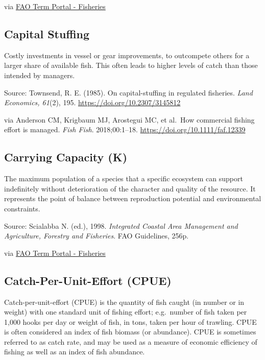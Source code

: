\documentclass[
  11pt,
]{book}
\begin{document}
via \href{http://www.fao.org/fishery/glossary/en}{FAO Term Portal - Fisheries}

\hypertarget{capital-stuffing}{%
\subsection{Capital Stuffing}\label{capital-stuffing}}

Costly investments in vessel or gear improvements, to outcompete others for a larger share of available fish. This often leads to higher levels of catch than those intended by managers.

Source: Townsend, R. E. (1985). On capital-stuffing in regulated fisheries. \emph{Land
Economics, 61}(2), 195. \url{https://doi.org/10.2307/3145812}

via Anderson CM, Krigbaum MJ,
Arostegui MC, et al.~How commercial fishing effort is managed. \emph{Fish Fish}. 2018;00:1--18. \url{https://doi.org/10.1111/faf.12339}

\hypertarget{carrying-capacity-k}{%
\subsection{Carrying Capacity (K)}\label{carrying-capacity-k}}

The maximum population of a species that a specific ecosystem can support indefinitely without deterioration of the character and quality of the resource. It represents the point of balance between reproduction potential and environmental constraints.

Source: Scialabba N. (ed.), 1998. \emph{Integrated Coastal Area Management and Agriculture, Forestry and Fisheries}. FAO Guidelines, 256p.

via \href{http://www.fao.org/fishery/glossary/en}{FAO Term Portal - Fisheries}

\hypertarget{catch-per-unit-effort-cpue}{%
\subsection{Catch-Per-Unit-Effort (CPUE)}\label{catch-per-unit-effort-cpue}}

Catch-per-unit-effort (CPUE) is the quantity of fish caught (in number or in weight) with one standard unit of fishing effort; e.g.~number of fish taken per 1,000 hooks per day or weight of fish, in tons, taken per hour of trawling. CPUE is often considered an index of fish biomass (or abundance). CPUE is sometimes referred to as catch rate, and may be used as a measure of economic efficiency of fishing as well as an index of fish abundance.
\end{document}
